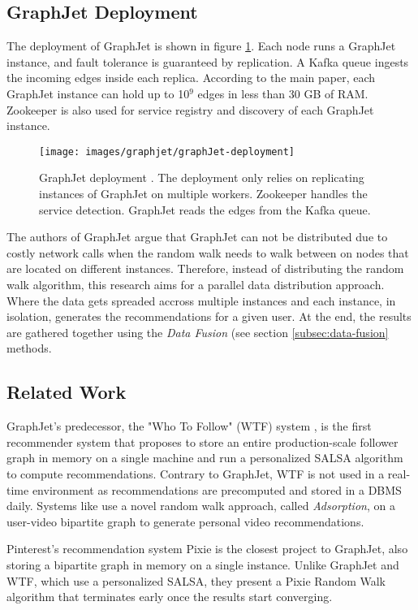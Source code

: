 \subsection{GraphJet Deployment}
\label{subsec:GraphJet-Deployment}
The deployment of GraphJet is shown in figure \ref{fig:graphJet-deployment}. Each node runs a GraphJet instance, and fault tolerance is guaranteed by replication. A Kafka queue ingests the incoming edges inside each replica. According to the main paper, each GraphJet instance can hold up to 10$^9$ edges in less than 30 GB of RAM. Zookeeper is also used for service registry and discovery of each GraphJet instance.
\begin{figure}[!htb]
    \centering
    \texttt{[image: images/graphjet/graphJet-deployment]}
    \caption{GraphJet deployment \cite{sharmaGraphJetRealtimeContent2016}. The deployment only relies on replicating instances of GraphJet on multiple workers. Zookeeper handles the service detection. GraphJet reads the edges from the Kafka queue.}
    \label{fig:graphJet-deployment}
\end{figure}

The authors of GraphJet argue that GraphJet can not be distributed due to costly network calls when the random walk needs to walk between on nodes that are located on different instances. Therefore, instead of distributing the random walk algorithm, this research aims for a parallel data distribution approach. Where the data gets spreaded accross multiple instances and each instance, in isolation, generates the recommendations for a given user. At the end, the results are gathered together using the \emph{Data Fusion} (see section \ref{subsec:data-fusion} methods.

\subsection{Related Work}
\label{subsec:graphjet-related-work}
GraphJet's predecessor, the "Who To Follow" (WTF) system \cite{guptaWTFWhoFollow2013}, is the first recommender system that proposes to store an entire production-scale follower graph in memory on a single machine and run a personalized SALSA algorithm to compute recommendations. Contrary to GraphJet, WTF is not used in a real-time environment as recommendations are precomputed and stored in a DBMS daily. Systems like \cite{balujaVideoSuggestionDiscovery2008} use a novel random walk approach, called \emph{Adsorption}, on a user-video bipartite graph to generate personal video recommendations.


Pinterest's recommendation system Pixie \cite{eksombatchaiPixieSystemRecommending2018} is the closest project to GraphJet, also storing a bipartite graph in memory on a single instance. Unlike GraphJet and WTF, which use a personalized SALSA, they present a Pixie Random Walk algorithm that terminates early once the results start converging.
